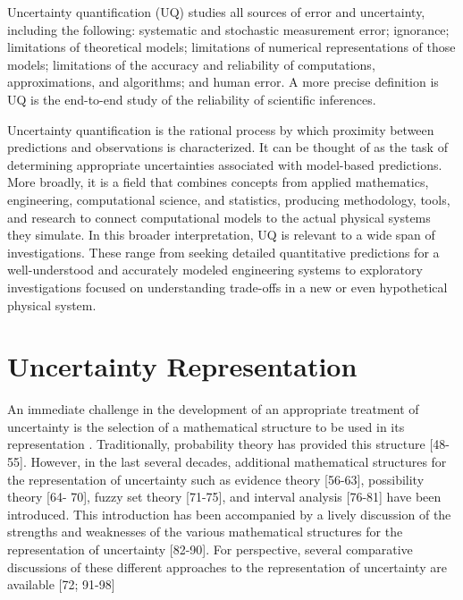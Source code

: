 \begin{defn}
Uncertainty quantification (UQ) studies all sources of error and uncertainty, including the following:  
systematic and stochastic measurement error; ignorance; limitations of theoretical models; limitations of 
numerical representations of those models; limitations of the accuracy and reliability of computations, 
approximations, and algorithms; and human error. A more precise definition is UQ is the end-to-end 
study of the reliability of scientific inferences. \cite{DEnergy2009}
\end{defn}

\begin{defn}
Uncertainty quantification is the rational process by which proximity between predictions and observations is characterized. It can be thought of as the task of determining appropriate uncertainties associated with model-based predictions. More broadly, it is a field that combines concepts from applied mathematics, engineering, computational science, and statistics, producing methodology, tools, and research to connect computational models to the actual physical systems they simulate. In this broader interpretation, UQ is relevant to a wide span of investigations. These range from seeking detailed quantitative predictions for a well-understood and accurately modeled engineering systems to exploratory investigations focused on understanding trade-offs in a new or even hypothetical physical system. \cite{Higdon2017}
\end{defn}

\section{Uncertainty Representation}

An immediate challenge in the development of an appropriate treatment of uncertainty is the selection of a mathematical structure to be used in its representation \cite{Helton2010}. Traditionally, probability theory has provided this structure [48-55]. However, in the last several decades, additional mathematical structures for the representation of uncertainty such as evidence theory [56-63], possibility theory [64- 70], fuzzy set theory [71-75], and interval analysis [76-81] have been introduced.
This introduction has been accompanied by a lively discussion of the strengths and weaknesses of the various mathematical structures for the representation of uncertainty [82-90]. For perspective, several comparative discussions of these different approaches to the representation of uncertainty are available [72; 91-98]

